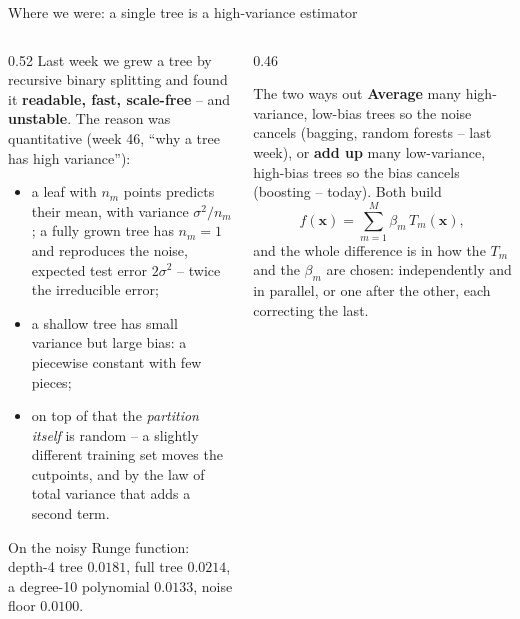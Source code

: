 \documentclass[10pt,aspectratio=169]{beamer}
\begin{document}
\begin{frame}{Where we were: a single tree is a high-variance estimator}
\begin{columns}[T]
\begin{column}{0.52\textwidth}
\small
Last week we grew a tree by recursive binary splitting and found it
\textbf{readable, fast, scale-free} -- and \textbf{unstable}.  The reason was
quantitative (week 46, ``why a tree has high variance''):
\begin{itemize}
  \item a leaf with $n_m$ points predicts their mean, with variance
    $\sigma^2/n_m$; a fully grown tree has $n_m=1$ and reproduces the noise,
    expected test error $2\sigma^2$ -- twice the irreducible error;
  \item a shallow tree has small variance but large bias: a piecewise
    constant with few pieces;
  \item on top of that the \emph{partition itself} is random -- a slightly
    different training set moves the cutpoints, and by the law of total
    variance that adds a second term.
\end{itemize}
On the noisy Runge function: depth-4 tree $0.0181$, full tree $0.0214$,
a degree-10 polynomial $0.0133$, noise floor $0.0100$.
\end{column}
\begin{column}{0.46\textwidth}
\begin{block}{The two ways out}
\small
\textbf{Average} many high-variance, low-bias trees so the noise cancels
(bagging, random forests -- last week), or \textbf{add up} many low-variance,
high-bias trees so the bias cancels (boosting -- today).  Both build
\[
f(\bm{x})=\sum_{m=1}^M \beta_m\, T_m(\bm{x}),
\]
and the whole difference is in how the $T_m$ and the $\beta_m$ are chosen:
independently and in parallel, or one after the other, each correcting the
last.
\end{block}
\end{column}
\end{columns}
\end{frame}
\end{document}
